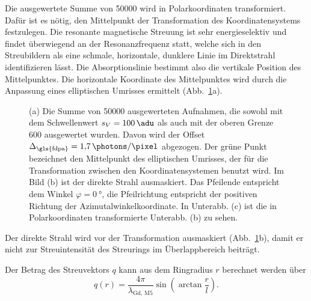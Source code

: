 \noindent
Die ausgewertete Summe von \SI{50000}{\captures} wird in Polarkoordinaten transformiert. Dafür ist es nötig, den Mittelpunkt der Transformation des Koordinatensystems festzulegen. Die resonante magnetische Streuung ist sehr energieselektiv und findet überwiegend an der Resonanzfrequenz statt, welche sich in den Streubildern als eine schmale, horizontale, dunklere Linie im Direktstrahl identifizieren lässt. Die Absorptionslinie bestimmt also die vertikale Position des Mittelpunktes. Die horizontale Koordinate des Mittelpunktes wird durch die Anpassung eines elliptischen Umrisses ermittelt (Abb.~\ref{fig:th-100-200-maske-radial-transform}a).
\begin{figure}[H]
    \centering
    
    \caption{(a) Die Summe von \num{50000} ausgewerteten Aufnahmen, die sowohl mit dem Schwellenwert $s_V = \SI{100}{\adu}$ als auch mit der oberen Grenze \SI{600}{\adu} ausgewertet wurden. Davon wird der Offset $\Delta_\text{\gls{fdpa}} = \SI[per-mode = symbol]{1,7}{\photons\per\pixel}$ abgezogen. Der grüne Punkt bezeichnet den Mittelpunkt des elliptischen Umrisses, der für die Transformation zwischen den Koordinatensystemen benutzt wird. Im Bild (b) ist der direkte Strahl ausmaskiert. Das Pfeilende entspricht dem Winkel $\varphi = \SI{0}{\degree}$, die Pfeilrichtung entspricht der positiven Richtung der Azimutalwinkelkoordinate. In Unterabb. (c) ist die in Polarkoordinaten transformierte Unterabb. (b) zu sehen.}
    \label{fig:th-100-200-maske-radial-transform}
\end{figure}

\noindent
Der direkte Strahl wird vor der Transformation ausmaskiert (Abb.~\ref{fig:th-100-200-maske-radial-transform}b), damit er nicht zur Streuintensität des Streurings im Überlappbereich beiträgt.

\noindent
Der Betrag des Streuvektors $q$ kann aus dem Ringradius $r$ berechnet werden über
\begin{equation}
    q(r) = \frac{4\pi}{\lambda_\text{Gd, M5}}\sin\left(\arctan\frac{r}{l}\right).
    \label{eq:streuvektor_von_radius}
\end{equation}

